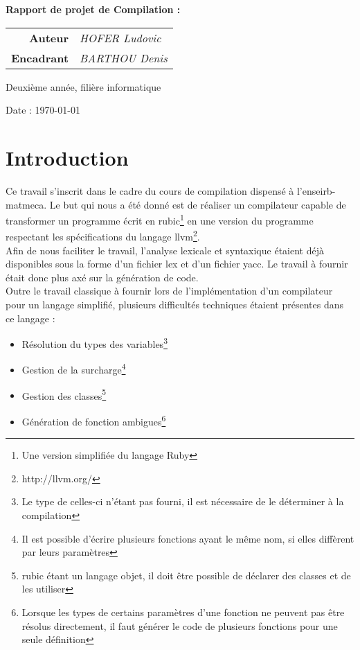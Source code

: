 \documentclass[12pt]{article}
\begin{document}
\thispagestyle{empty}


\begin{center}
	\Huge{\textbf{Rapport de projet de Compilation :}}
\end{center}


\begin{tabular}{r@{:~}l}
	\textbf{Auteur} & \textit{HOFER Ludovic}\\
  \textbf{Encadrant} & \textit{BARTHOU Denis}\\
\end{tabular}


\begin{center}Deuxième année, filière informatique

	Date : \today
\end{center}

\newpage

\section{Introduction}
Ce travail s'inscrit dans le cadre du cours de compilation dispensé à
l'enseirb-matmeca. Le but qui nous a été donné est de réaliser un compilateur
capable de transformer un programme écrit en rubic\footnote{Une version
simplifiée du langage Ruby} en une version du programme respectant les
spécifications du langage llvm\footnote{http://llvm.org/}.\\

Afin de nous faciliter le travail, l'analyse lexicale et syntaxique étaient
déjà disponibles sous la forme d'un fichier lex et d'un fichier yacc. Le
travail à fournir était donc plus axé sur la génération de code.\\

Outre le travail classique à fournir lors de l'implémentation d'un
compilateur pour un langage simplifié, plusieurs difficultés techniques
étaient présentes dans ce langage :

\begin{itemize}
\item Résolution du types des variables\footnote{Le type de celles-ci
  n'étant pas fourni, il est nécessaire de le déterminer à la compilation}
\item Gestion de la surcharge\footnote{Il est possible d'écrire plusieurs
  fonctions ayant le même nom, si elles diffèrent par leurs paramètres}
\item Gestion des classes\footnote{rubic étant un langage objet,
  il doit être possible de déclarer des classes et de les utiliser}
\item Génération de fonction ambigues\footnote{Lorsque les types de certains
  paramètres d'une fonction ne peuvent pas être résolus directement, il faut
  générer le code de plusieurs fonctions pour une seule définition}
\end{itemize}
\end{document}
